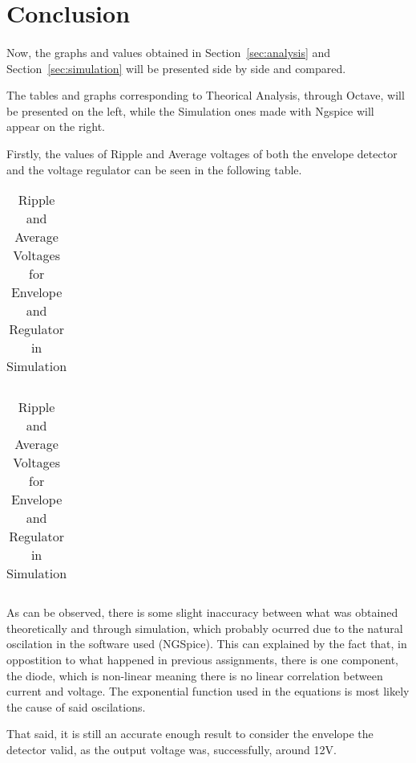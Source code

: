 \section{Conclusion}
\label{sec:conclusion}
\paragraph{}
\par Now, the graphs and values obtained in Section~\ref{sec:analysis} and Section~\ref{sec:simulation} will be presented side by side and compared.
\par The tables and graphs corresponding to Theorical Analysis, through Octave, will be presented on the left, while the Simulation ones made with Ngspice will appear on the right.
\par Firstly, the values of Ripple and Average voltages of both the envelope detector and the voltage regulator can be seen in the following table.

\begin{table}[H]
	\begin{minipage}{.5\linewidth}
		\centering
		\begin{tabular}{|c|c|}
		\hline
		
		\end{tabular}
		\caption{Ripple and Average Voltages for Envelope and Regulator in Theoretical Analysis}
		\label{table1a}
	\end{minipage}
	\begin{minipage}{.5\linewidth}
		\centering
		\begin{tabular}{|c|c|}
		\hline
		
	\end{tabular}
 		\caption{Ripple and Average Voltages for Envelope and Regulator in Simulation}
		\label{table1b}
	\end{minipage} 
\end{table}

\par As can be observed, there is some slight inaccuracy between what was obtained theoretically and through simulation, which probably ocurred due to the natural oscilation in the software used (NGSpice). This can explained by the fact that, in oppostition to what happened in previous assignments, there is one component, the diode, which is non-linear meaning there is no linear correlation between current and voltage. The exponential function used in the equations is most likely the cause of said oscilations.
\par That said, it is still an accurate enough result to consider the envelope the detector valid, as the output voltage was, successfully, around 12V.

